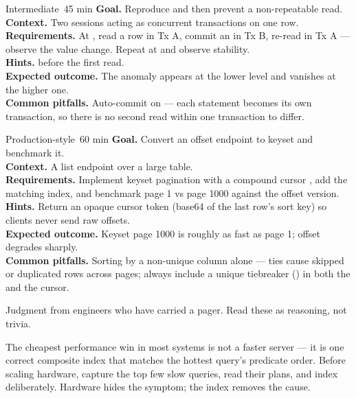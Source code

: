 \begin{minilab}{Intermediate}{~45 min}
\textbf{Goal.} Reproduce and then prevent a non-repeatable read.\\
\textbf{Context.} Two  sessions acting as concurrent transactions on one row.\\
\textbf{Requirements.} At , read a row in Tx A, commit an  in Tx B, re-read in Tx A --- observe the value change. Repeat at  and observe stability.\\
\textbf{Hints.}  before the first read.\\
\textbf{Expected outcome.} The anomaly appears at the lower level and vanishes at the higher one.\\
\textbf{Common pitfalls.} Auto-commit on --- each statement becomes its own transaction, so there is no second read within one transaction to differ.
\end{minilab}

\begin{minilab}{Production-style}{~60 min}
\textbf{Goal.} Convert an offset endpoint to keyset and benchmark it.\\
\textbf{Context.} A list endpoint over a large  table.\\
\textbf{Requirements.} Implement keyset pagination with a compound cursor , add the matching index, and benchmark page 1 vs page 1000 against the offset version.\\
\textbf{Hints.} Return an opaque cursor token (base64 of the last row's sort key) so clients never send raw offsets.\\
\textbf{Expected outcome.} Keyset page 1000 is roughly as fast as page 1; offset degrades sharply.\\
\textbf{Common pitfalls.} Sorting by a non-unique column alone --- ties cause skipped or duplicated rows across pages; always include a unique tiebreaker () in both the  and the cursor.
\end{minilab}


Judgment from engineers who have carried a pager. Read these as reasoning, not trivia.

\begin{seniornote}
The cheapest performance win in most systems is not a faster server --- it is one correct composite index that matches the hottest query's predicate order. Before scaling hardware, capture the top few slow queries, read their plans, and index deliberately. Hardware hides the symptom; the index removes the cause.
\end{seniornote}

